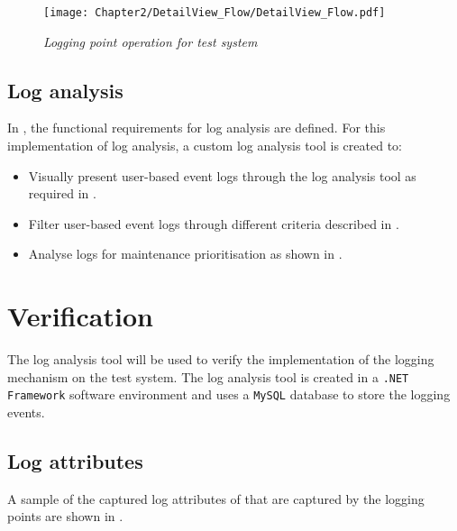\clearpage

\begin{figure}[!htb]
	\centering %
	\texttt{[image: Chapter2/DetailView\_Flow/DetailView\_Flow.pdf]}
	\caption[Logging point operation for test system]
	{\textit{Logging point operation for test system}}\label{fig:ch3_loggingProcess}
\end{figure}

\clearpage

\subsection{Log analysis}\label{sec:ch3_implementationLogAnalysis}
In , the functional requirements for log analysis are defined. For this implementation of log analysis, a custom log analysis tool is created to:

\begin{itemize}
\item Visually present user-based event logs through the log analysis tool as required in .
\item Filter user-based event logs through different criteria described in .
\item Analyse logs for maintenance prioritisation as shown in .
\end{itemize}

\section{Verification}\label{sec:ch3_Verification}
The log analysis tool will be used to verify the implementation of the logging mechanism on the test system. The log analysis tool is created in a \texttt{.NET Framework} software environment and uses a \texttt{MySQL} database to store the logging events.

\subsection{Log attributes}
A sample of the captured log attributes of  that are captured by the logging points are shown in .

